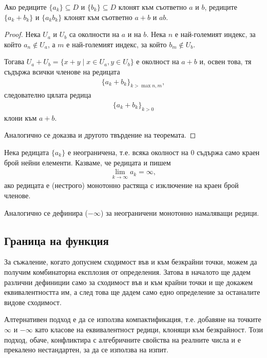 \documentclass[numbers=endperiod, bibliography=totocnumbered]{scrartcl}
\begin{document}
\begin{proposition}\label{thm:limits_of_elementwise_sums_and_products}
  Ако редиците \( \{ a_k \} \subseteq D \) и \( \{ b_k \} \subseteq D \) клонят към съответно \( a \) и \( b \), редиците \( \{ a_k + b_k \} \) и \( \{ a_k b_k \} \) клонят към съответно \( a + b \) и \( ab \).
\end{proposition}
\begin{proof}
  Нека \( U_a \) и \( U_b \) са околности на \( a \) и на \( b \). Нека \( n \) е най-големият индекс, за който \( a_n \not\in U_a \), а \( m \) е най-големият индекс, за който \( b_m \not\in U_b \).

  Тогава \( U_a + U_b = \{ x + y \mid x \in U_a, y \in U_b \} \) е околност на \( a + b \) и, освен това, тя съдържа всички членове на редицата
  \begin{align*}
    {\{ a_k + b_k \}}_{k > \max{n, m}},
  \end{align*}
  следователно цялата редица
  \begin{align*}
    {\{ a_k + b_k \}}_{k > 0}
  \end{align*}
  клони към \( a + b \).

  Аналогично се доказва и другото твърдение на теоремата.
\end{proof}

\begin{definition}
  Нека редицата \( \{ a_k \} \) е неограничена, т.е. всяка околност на \( 0 \) съдържа само краен брой нейни елементи. Казваме, че редицата  и пишем
  \begin{align*}
    \lim_{k \to \infty} a_k = \infty,
  \end{align*}
  ако редицата е (нестрого) монотонно растяща с изключение на краен брой членове.

  Аналогично се дефинира  (\( -\infty \)) за неограничени монотонно намаляващи редици.
\end{definition}

\subsection{Граница на функция}

\begin{note}
  За съжаление, когато допуснем сходимост във и към безкрайни точки, можем да получим комбинаторна експлозия от определения. Затова в началото ще дадем различни дефиниции само за сходимост във и към крайни точки и ще докажем еквивалентността им, а след това ще дадем само едно определение за останалите видове сходимост.

  Алтернативен подход е да се използва компактификация, т.е. добавяне на точките \( \infty \) и \( -\infty \) като класове на еквивалентност редици, клонящи към безкрайност. Този подход, обаче, конфликтира с алгебричните свойства на реалните числа и е прекалено нестандартен, за да се използва на изпит.
\end{note}
\end{document}
